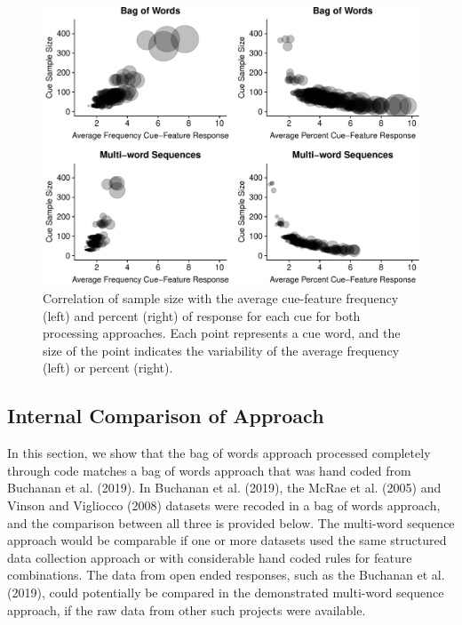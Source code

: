 \documentclass[man]{apa6}
\begin{document}
\begin{figure}
\centering
\includegraphics{flt_manuscript_files/figure-latex/correlation-fig-1.pdf}
\caption{\label{fig:correlation-fig}Correlation of sample size with the average cue-feature frequency (left) and percent (right) of response for each cue for both processing approaches. Each point represents a cue word, and the size of the point indicates the variability of the average frequency (left) or percent (right).}
\end{figure}

\hypertarget{internal-comparison-of-approach}{%
\subsection{Internal Comparison of Approach}\label{internal-comparison-of-approach}}

In this section, we show that the bag of words approach processed completely through code matches a bag of words approach that was hand coded from Buchanan et al. (2019). In Buchanan et al. (2019), the McRae et al. (2005) and Vinson and Vigliocco (2008) datasets were recoded in a bag of words approach, and the comparison between all three is provided below. The multi-word sequence approach would be comparable if one or more datasets used the same structured data collection approach or with considerable hand coded rules for feature combinations. The data from open ended responses, such as the Buchanan et al. (2019), could potentially be compared in the demonstrated multi-word sequence approach, if the raw data from other such projects were available.
\end{document}
